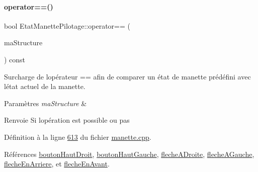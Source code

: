 \paragraph{\texorpdfstring{operator==()}{operator==()}}
{\footnotesize\ttfamily bool Etat\+Manette\+Pilotage\+::operator== (\begin{DoxyParamCaption}\item[{const \hyperlink{struct_etat_manette_pilotage}{Etat\+Manette\+Pilotage} \&}]{ma\+Structure }\end{DoxyParamCaption}) const}



Surcharge de l\textquotesingle{}opérateur == afin de comparer un état de manette prédéfini avec l\textquotesingle{}état actuel de la manette. 


\begin{DoxyParams}{Paramètres}
{\em ma\+Structure} & \\
\hline
\end{DoxyParams}
\begin{DoxyReturn}{Renvoie}
Si l\textquotesingle{}opération est possible ou pas 
\end{DoxyReturn}


Définition à la ligne \hyperlink{manette_8cpp_source_l00613}{613} du fichier \hyperlink{manette_8cpp_source}{manette.\+cpp}.



Références \hyperlink{manette_8h_source_l00157}{bouton\+Haut\+Droit}, \hyperlink{manette_8h_source_l00156}{bouton\+Haut\+Gauche}, \hyperlink{manette_8h_source_l00155}{fleche\+A\+Droite}, \hyperlink{manette_8h_source_l00154}{fleche\+A\+Gauche}, \hyperlink{manette_8h_source_l00153}{fleche\+En\+Arriere}, et \hyperlink{manette_8h_source_l00152}{fleche\+En\+Avant}.


